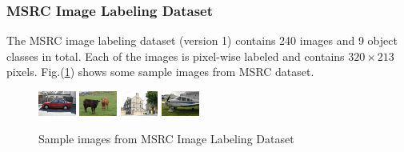 \documentclass{acm_proc_article-sp}
\begin{document}
\subsubsection{MSRC Image Labeling Dataset}
The MSRC image labeling dataset (version 1) \cite{msrc} contains 240 images and 9 object classes in total. 
Each of the images is pixel-wise labeled and contains $320\times213$ pixels. Fig.(\ref{fig:msrc}) shows some sample images from MSRC dataset.
\begin{figure}[!htb]
\centering
\includegraphics[width=0.11\textwidth]{fig/sample-msrc1}
\includegraphics[width=0.11\textwidth]{fig/sample-msrc2}
\includegraphics[width=0.11\textwidth]{fig/sample-msrc3}
\includegraphics[width=0.11\textwidth]{fig/sample-msrc4}
\caption{Sample images from MSRC Image Labeling Dataset}\label{fig:msrc}
\end{figure}
\end{document}
